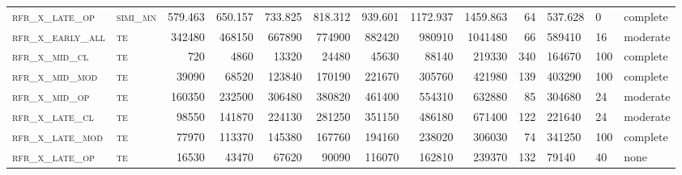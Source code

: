 \begin{landscape}
\begin{center}
\begin{footnotesize}
\begin{longtable}{llrrrrr|rrr}
\textsc{rfr\_x\_late\_op  } & \textsc{simi\_mn  }   & 579.463 & 650.157 & 733.825 & 818.312  & 939.601  & 1172.937 & 1459.863 & 64     & 537.628       & 0             & complete            \\
\textsc{rfr\_x\_early\_all} & \textsc{te  	    }   & 342480  & 468150  & 667890  & 774900   & 882420   & 980910   & 1041480  & 66     & 589410        & 16            & moderate        \\
\textsc{rfr\_x\_mid\_cl   } & \textsc{te        }   & 720     & 4860    & 13320   & 24480    & 45630    & 88140    & 219330   & 340    & 164670        & 100           & complete        \\
\textsc{rfr\_x\_mid\_mod  } & \textsc{te        }   & 39090   & 68520   & 123840  & 170190   & 221670   & 305760   & 421980   & 139    & 403290        & 100           & complete        \\
\textsc{rfr\_x\_mid\_op   } & \textsc{te        }   & 160350  & 232500  & 306480  & 380820   & 461400   & 554310   & 632880   & 85     & 304680        & 24            & moderate        \\
\textsc{rfr\_x\_late\_cl  } & \textsc{te        }   & 98550   & 141870  & 224130  & 281250   & 351150   & 486180   & 671400   & 122    & 221640        & 24            & moderate        \\
\textsc{rfr\_x\_late\_mod } & \textsc{te        }   & 77970   & 113370  & 145380  & 167760   & 194160   & 238020   & 306030   & 74     & 341250        & 100           & complete        \\
\textsc{rfr\_x\_late\_op  } & \textsc{te        }   & 16530   & 43470   & 67620   & 90090    & 116070   & 162810   & 239370   & 132    & 79140         & 40            & none       

\end{longtable}
\end{footnotesize}
\end{center}
\end{landscape}

\restoregeometry
\pagestyle{headings}


